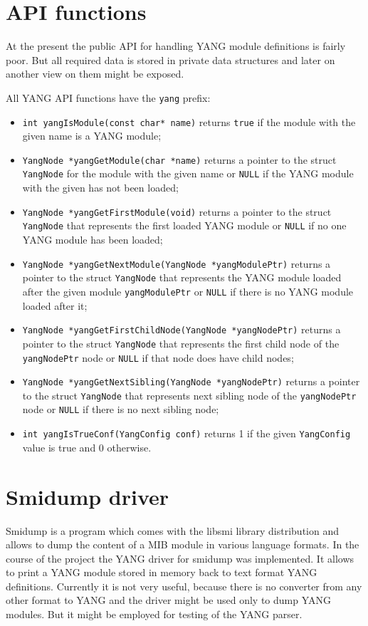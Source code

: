 \documentclass[conference]{IEEEtran}
\begin{document}
\section{API functions}
At the present the public API for handling YANG module definitions is fairly poor. But all required data is stored in private data structures and later on another view on them might be exposed.

All YANG API functions have the \texttt{yang} prefix:
\begin{itemize}
\item \texttt{int yangIsModule(const char* name)} returns \texttt{true} if the module with the given name is a YANG module;
\item \texttt{YangNode *yangGetModule(char *name)} returns a pointer to the struct \texttt{YangNode} for the module with the given name or \texttt{NULL} if the YANG module with the given has not been loaded;
\item \texttt{YangNode *yangGetFirstModule(void)} returns a pointer to the struct \texttt{YangNode} that represents the first loaded YANG module or \texttt{NULL} if no one YANG module has been loaded;
\item \texttt{YangNode *yangGetNextModule(YangNode *yangModulePtr)} returns a pointer to the struct \texttt{YangNode} that represents the YANG module loaded after the given module \texttt{yangModulePtr} or \texttt{NULL} if there is no YANG module loaded after it;
\item \texttt{YangNode *yangGetFirstChildNode(YangNode *yangNodePtr)} returns a pointer to the struct \texttt{YangNode} that represents the first child node of the \texttt{yangNodePtr} node or \texttt{NULL} if that node does have child nodes;
\item \texttt{YangNode *yangGetNextSibling(YangNode *yangNodePtr)} returns a pointer to the struct \texttt{YangNode} that represents next sibling node of the \texttt{yangNodePtr} node or \texttt{NULL} if there is no next sibling node;
\item \texttt{int yangIsTrueConf(YangConfig conf)} returns 1 if the given \texttt{YangConfig} value is true and 0 otherwise.
\end{itemize}

\section{Smidump driver}
Smidump is a program which comes with the libsmi library distribution and allows to dump the content of a MIB module in various language formats. In the course of the project the YANG driver for smidump was implemented. It allows to print a YANG module stored in memory back to text format YANG definitions. Currently it is not very useful, because there is no converter from any other format to YANG and the driver might be used only to dump YANG modules. But it might be employed for testing of the YANG parser.
\end{document}
